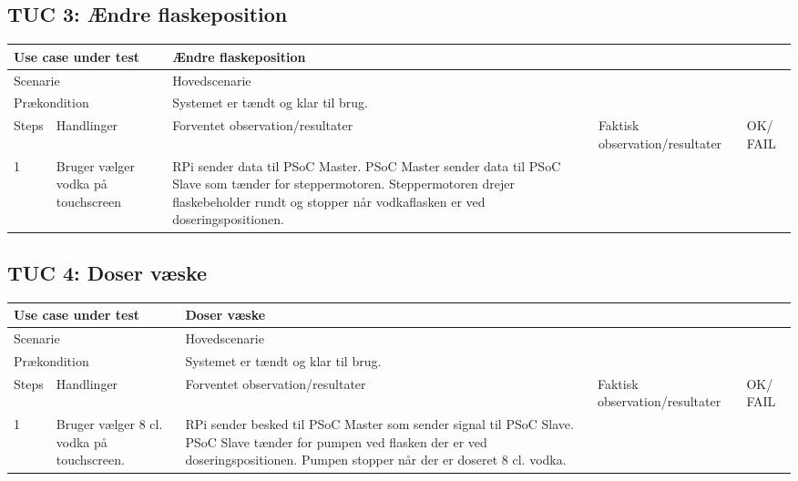 \subsection{TUC 3: Ændre flaskeposition}

\begin{table}[H]
\begin{tabular}{|p{1cm}|p{4cm}|p{4cm}|p{4cm}|p{1cm}|}
\hline
\multicolumn{2}{|p{5cm}|}{Use case under test} & \multicolumn{3}{p{9cm}|}{Ændre flaskeposition}                                       \\ \hline
\multicolumn{2}{|p{5cm}|}{Scenarie}            & \multicolumn{3}{p{9cm}|}{Hovedscenarie}                                          \\ \hline
\multicolumn{2}{|p{5cm}|}{Prækondition}        & \multicolumn{3}{p{9cm}|}{Systemet er tændt og klar til brug.}                                 \\ \hline
Steps               & Handlinger          & Forventet observation/resultater & Faktisk observation/resultater & OK/ FAIL \\ \hline
1    & Bruger vælger vodka på touchscreen  &  RPi sender data til PSoC Master. PSoC Master sender data til PSoC Slave som tænder for steppermotoren. Steppermotoren drejer flaskebeholder rundt og stopper når vodkaflasken er ved doseringspositionen. &   &         \\ \hline

\end{tabular}
\end{table}

\subsection{TUC 4: Doser væske}

\begin{table}[H]
\begin{tabular}{|p{1cm}|p{4cm}|p{4cm}|p{4cm}|p{1cm}|}
\hline
\multicolumn{2}{|p{5cm}|}{Use case under test} & \multicolumn{3}{p{9cm}|}{Doser væske}                                       \\ \hline
\multicolumn{2}{|p{5cm}|}{Scenarie}            & \multicolumn{3}{p{9cm}|}{Hovedscenarie}                                          \\ \hline
\multicolumn{2}{|p{5cm}|}{Prækondition}        & \multicolumn{3}{p{9cm}|}{Systemet er tændt og klar til brug.}                                 \\ \hline
Steps               & Handlinger          & Forventet observation/resultater & Faktisk observation/resultater & OK/ FAIL \\ \hline
1    & Bruger vælger 8 cl. vodka på touchscreen.  &  RPi sender besked til PSoC Master som sender signal til PSoC Slave. PSoC Slave tænder for pumpen ved flasken der er ved doseringspositionen. Pumpen stopper når der er doseret 8 cl. vodka. &   &         \\ \hline

\end{tabular}
\end{table}

